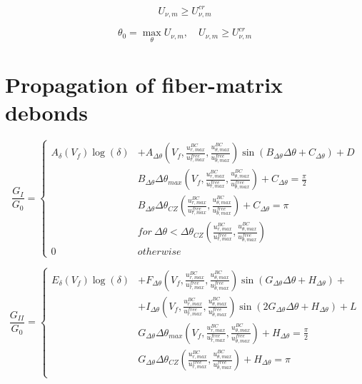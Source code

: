 \documentclass[review]{elsarticle}
\begin{document}
\begin{equation}
U_{\nu,m}\geq U_{\nu,m}^{cr}
\end{equation}

\begin{equation}
\theta_{0}=\max_{\theta}{U_{\nu,m}},\quad U_{\nu,m}\geq U_{\nu,m}^{cr}
\end{equation}

\section{Propagation of fiber-matrix debonds}

\begin{equation}
\frac{G_{I}}{G_{0}}=\begin{cases}
A_{\delta}\left(V_{f}\right)\log\left(\delta\right)&+A_{\Delta\theta}\left(V_{f},\frac{u^{BC}_{r,max}}{u^{free}_{r,max}},\frac{u^{BC}_{\theta,max}}{u^{free}_{\theta,max}}\right)\sin\left(B_{\Delta\theta}\Delta\theta+C_{\Delta\theta}\right)+D\\
&B_{\Delta\theta}\Delta\theta_{max}\left(V_{f},\frac{u^{BC}_{r,max}}{u^{free}_{r,max}},\frac{u^{BC}_{\theta,max}}{u^{free}_{\theta,max}}\right)+C_{\Delta\theta}=\frac{\pi}{2}\\
&B_{\Delta\theta}\Delta\theta_{CZ}\left(\frac{u^{BC}_{r,max}}{u^{free}_{r,max}},\frac{u^{BC}_{\theta,max}}{u^{free}_{\theta,max}}\right)+C_{\Delta\theta}=\pi\\
&for\ \Delta\theta<\Delta\theta_{CZ}\left(\frac{u^{BC}_{r,max}}{u^{free}_{r,max}},\frac{u^{BC}_{\theta,max}}{u^{free}_{\theta,max}}\right)\\
0&otherwise
\end{cases}
\end{equation}

\begin{equation}
\frac{G_{II}}{G_{0}}=\begin{cases}
E_{\delta}\left(V_{f}\right)\log\left(\delta\right)&+F_{\Delta\theta}\left(V_{f},\frac{u^{BC}_{r,max}}{u^{free}_{r,max}},\frac{u^{BC}_{\theta,max}}{u^{free}_{\theta,max}}\right)\sin\left(G_{\Delta\theta}\Delta\theta+H_{\Delta\theta}\right)+\\&+I_{\Delta\theta}\left(V_{f},\frac{u^{BC}_{r,max}}{u^{free}_{r,max}},\frac{u^{BC}_{\theta,max}}{u^{free}_{\theta,max}}\right)\sin\left(2G_{\Delta\theta}\Delta\theta+H_{\Delta\theta}\right)+L\\
&G_{\Delta\theta}\Delta\theta_{max}\left(V_{f},\frac{u^{BC}_{r,max}}{u^{free}_{r,max}},\frac{u^{BC}_{\theta,max}}{u^{free}_{\theta,max}}\right)+H_{\Delta\theta}=\frac{\pi}{2}\\
&G_{\Delta\theta}\Delta\theta_{CZ}\left(\frac{u^{BC}_{r,max}}{u^{free}_{r,max}},\frac{u^{BC}_{\theta,max}}{u^{free}_{\theta,max}}\right)+H_{\Delta\theta}=\pi\\
\end{cases}
\end{equation}
\end{document}
